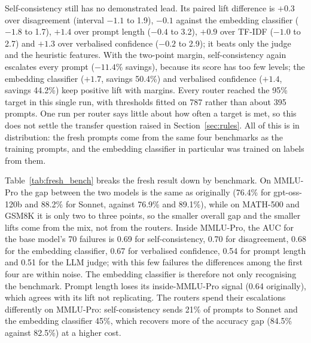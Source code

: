 \documentclass[11pt]{article}
\begin{document}
Self-consistency still has no demonstrated lead. Its paired lift difference is $+0.3$ over disagreement (interval $-1.1$ to 1.9), $-0.1$ against the embedding classifier ($-1.8$ to 1.7), $+1.4$ over prompt length ($-0.4$ to 3.2), $+0.9$ over TF-IDF ($-1.0$ to 2.7) and $+1.3$ over verbalised confidence ($-0.2$ to 2.9); it beats only the judge and the heuristic features. With the two-point margin, self-consistency again escalates every prompt ($-11.4$\% savings), because its score has too few levels; the embedding classifier ($+1.7$, savings 50.4\%) and verbalised confidence ($+1.4$, savings 44.2\%) keep positive lift with margins. Every router reached the 95\% target in this single run, with thresholds fitted on 787 rather than about 395 prompts. One run per router says little about how often a target is met, so this does not settle the transfer question raised in Section~\ref{sec:rules}. All of this is in distribution: the fresh prompts come from the same four benchmarks as the training prompts, and the embedding classifier in particular was trained on labels from them.



Table~\ref{tab:fresh_bench} breaks the fresh result down by benchmark. On MMLU-Pro the gap between the two models is the same as originally (76.4\% for gpt-oss-120b and 88.2\% for Sonnet, against 76.9\% and 89.1\%), while on MATH-500 and GSM8K it is only two to three points, so the smaller overall gap and the smaller lifts come from the mix, not from the routers. Inside MMLU-Pro, the AUC for the base model's 70 failures is 0.69 for self-consistency, 0.70 for disagreement, 0.68 for the embedding classifier, 0.67 for verbalised confidence, 0.54 for prompt length and 0.51 for the LLM judge; with this few failures the differences among the first four are within noise. The embedding classifier is therefore not only recognising the benchmark. Prompt length loses its inside-MMLU-Pro signal (0.64 originally), which agrees with its lift not replicating. The routers spend their escalations differently on MMLU-Pro: self-consistency sends 21\% of prompts to Sonnet and the embedding classifier 45\%, which recovers more of the accuracy gap (84.5\% against 82.5\%) at a higher cost.



\FloatBarrier
\end{document}
